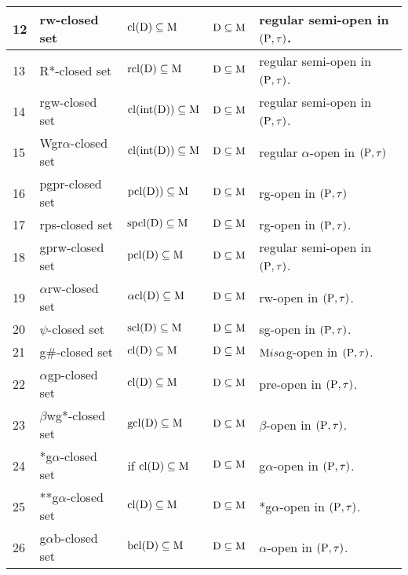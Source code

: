 {\begin{longtable}{@{}|p{.9cm}|>{\raggedright}p{5cm}|>{\centering}p{2.5cm}|>{\centering}p{1.7cm}|>{\centering}p{2.8cm}|@{}}
\hline
12 & rw-closed set \cite{Benchalli} & $\mathrm{cl}(\mathrm{D}) \subseteq \mathrm{M}$ & $\mathrm{D} \subseteq \mathrm{M}$ & regular semi-open in $(\mathrm{P}, \tau)$.\tabularnewline
\hline
13 & R*-closed set \cite{Janaki3} & $\mathrm{rcl}(\mathrm{D}) \subseteq \mathrm{M}$ & $\mathrm{D} \subseteq \mathrm{M}$ & regular semi-open in $(\mathrm{P}, \tau)$.\tabularnewline
\hline
14 & rgw-closed set \cite{Sanjay} & $\mathrm{cl}(\mbox{int}(\mathrm{D}))\subseteq \mathrm{M}$ & $\mathrm{D} \subseteq \mathrm{M}$ & regular semi-open in $(\mathrm{P}, \tau)$.\tabularnewline
\hline
15 & Wgr$\alpha$-closed set \cite{Janaki1} & $\mathrm{cl}(\mbox{int}(\mathrm{D})) \subseteq \mathrm{M}$ & $\mathrm{D} \subseteq \mathrm{M}$ & regular $\alpha$-open in $(\mathrm{P}, \tau)$\tabularnewline
\hline
16 & pgpr-closed set \cite{Anitha} & $\mathrm{pcl}(\mathrm{D})) \subseteq \mathrm{M}$ & $\mathrm{D} \subseteq \mathrm{M}$ & rg-open in $(\mathrm{P}, \tau)$\tabularnewline
\hline
17 & rps-closed set \cite{Shyala} & $\mathrm{spcl}(\mathrm{D}) \subseteq \mathrm{M}$ & $\mathrm{D} \subseteq \mathrm{M}$ & rg-open in $(\mathrm{P}, \tau)$.\tabularnewline
\hline
18 & gprw-closed set \cite{Sanjay1} & $\mathrm{pcl}(\mathrm{D}) \subseteq \mathrm{M}$ & $\mathrm{D} \subseteq \mathrm{M}$ & regular semi-open in $(\mathrm{P}, \tau)$.\tabularnewline
\hline
19 & $\alpha$rw-closed set \cite{Wali3} & $\alpha\mathrm{cl}(\mathrm{D}) \subseteq \mathrm{M}$ & $\mathrm{D}\subseteq\mathrm{M}$ & rw-open in $(\mathrm{P}, \tau)$.\tabularnewline
\hline
20 & $\psi$-closed set \cite{Veerakumar2} & $\mathrm{scl}(\mathrm{D}) \subseteq \mathrm{M}$ & $\mathrm{D} \subseteq \mathrm{M}$ & sg-open in $(\mathrm{P}, \tau)$.\tabularnewline
\hline
21 & g\#-closed set \cite{Veerakumar} & $\mathrm{cl}(\mathrm{D}) \subseteq \mathrm{M}$ & $\mathrm{D} \subseteq \mathrm{M}$ & $\mathrm{M} is \alpha$g-open in $(\mathrm{P}, \tau)$.\tabularnewline
\hline
22 & $\alpha$gp-closed set \cite{Navalagi2} & $\mathrm{cl}(\mathrm{D}) \subseteq \mathrm{M}$ & $\mathrm{D} \subseteq \mathrm{M}$ & pre-open in $(\mathrm{P}, \tau)$.\tabularnewline
\hline
23 & $\beta$wg*-closed set \cite{Dhanapakyam} & $\mathrm{gcl}(\mathrm{D}) \subseteq \mathrm{M}$ & $\mathrm{D} \subseteq \mathrm{M}$ & $\beta$-open in $(\mathrm{P}, \tau)$.\tabularnewline
\hline
24 & *g$\alpha$-closed set \cite{Vigneshwaran} & if $\mathrm{cl}(\mathrm{D}) \subseteq \mathrm{M}$ & $\mathrm{D} \subseteq \mathrm{M}$ & g$\alpha$-open in $(\mathrm{P},\tau)$.\tabularnewline
\hline
25 & {*}{*}g$\alpha$-closed set \cite{Vigneshwaran1} & $\mathrm{cl}(\mathrm{D}) \subseteq \mathrm{M}$ & $\mathrm{D} \subseteq \mathrm{M}$ & *g$\alpha$-open in $(\mathrm{P}, \tau)$.\tabularnewline
\hline
26 & g$\alpha$b-closed set \cite{Nagaveni7} & $\mathrm{bcl}(\mathrm{D}) \subseteq \mathrm{M}$ & $\mathrm{D} \subseteq \mathrm{M}$ & $\alpha$-open in $(\mathrm{P}, \tau)$.\tabularnewline

\end{longtable}}
